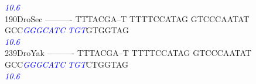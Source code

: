 \documentclass[11pt,twoside,reqno,a4paper]{article}
\begin{document}
{\hspace*{4\charwidth}\hspace*{7\charwidth}\hspace*{1\charwidth}\hspace*{1\charwidth}\hspace*{1\charwidth}\hspace*{1\charwidth}\hspace*{43\charwidth}\textit{\textcolor{blue}{10.6}}\hspace*{1\charwidth}\hspace*{1\charwidth}\\
190\hspace*{1\charwidth}DroSec	----------	TTTACGA--T	TTTTCCATAG	GTCCCAATAT	GCC\textit{\textcolor{blue}{G}}\textit{\textcolor{blue}{G}}\textit{\textcolor{blue}{G}}\textit{\textcolor{blue}{C}}\textit{\textcolor{blue}{A}}\textit{\textcolor{blue}{T}}\textit{\textcolor{blue}{C}}	\textit{\textcolor{blue}{T}}\textit{\textcolor{blue}{G}}\textit{\textcolor{blue}{T}}GTGGTAG	\\
\hspace*{4\charwidth}\hspace*{7\charwidth}\hspace*{1\charwidth}\hspace*{1\charwidth}\hspace*{1\charwidth}\hspace*{1\charwidth}\hspace*{43\charwidth}\textit{\textcolor{blue}{10.6}}\hspace*{1\charwidth}\hspace*{1\charwidth}\\
239\hspace*{1\charwidth}DroYak	----------	TTTACGA--T	TTTTCCATAG	GTCCCAATAT	GCC\textit{\textcolor{blue}{G}}\textit{\textcolor{blue}{G}}\textit{\textcolor{blue}{G}}\textit{\textcolor{blue}{C}}\textit{\textcolor{blue}{A}}\textit{\textcolor{blue}{T}}\textit{\textcolor{blue}{C}}	\textit{\textcolor{blue}{T}}\textit{\textcolor{blue}{G}}\textit{\textcolor{blue}{T}}CTGGTAG	\\
\hspace*{4\charwidth}\hspace*{7\charwidth}\hspace*{1\charwidth}\hspace*{1\charwidth}\hspace*{1\charwidth}\hspace*{1\charwidth}\hspace*{43\charwidth}\textit{\textcolor{blue}{10.6}}\hspace*{1\charwidth}\hspace*{1\charwidth}\\
}
\end{document}
